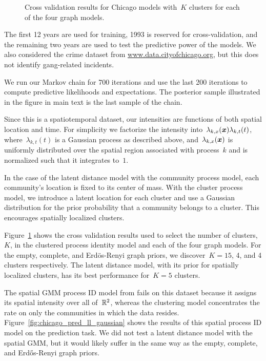 \begin{figure}[!t]
\begin{subfigure}[T]{.24\linewidth}
\begin{center}
\end{center}
\end{subfigure}
\caption{Cross validation results for Chicago models with~$K$ clusters for each of the four graph models.}
\label{fig:chicago_xv}
\end{figure}

The first 12 years are used for training, 1993 is reserved for cross-validation, and the remaining two years are used to test the predictive power of the models. We also considered the crime dataset from \url{www.data.cityofchicago.org}, but this does not identify gang-related incidents.

We run our Markov chain for 700 iterations and use the last 200 iterations to compute predictive likelihoods and expectations. The posterior sample illustrated in the figure in main text is the last sample of the chain.

Since this is a spatiotemporal dataset, our intensities are functions of both spatial location and time. For simplicity we factorize the intensity into~${\lambda_{k,x}(\boldsymbol{x})\lambda_{k,t}(t)}$, where~${\lambda_{k,t}(t)}$ is a Gaussian process as described above, and~${\lambda_{k,x}(\boldsymbol{x})}$ is uniformly distributed over the spatial region associated with process~$k$ and is normalized such that it integrates to~$1$. 

In the case of the latent distance model with the community process model, each community's location is fixed to its center of mass. With the cluster process model, we introduce a latent location for each cluster and use a Gaussian distribution for the prior probability that a community belongs to a cluster. This encourages spatially localized clusters.

Figure~\ref{fig:chicago_xv} shows the cross validation results used to select the number of clusters,~$K$, in the clustered process identity model and each of the four graph models. For the empty, complete, and Erd\"os-Renyi graph priors, we discover~${K=15}$, 4, and 4 clusters respectively. The latent distance model, with its prior for spatially localized clusters, has its best performance for~${K=5}$ clusters. 

The spatial GMM process ID model from \citet{Cho-2013} fails on this dataset because it assigns its spatial intensity over all of~$\mathbb{R}^2$, whereas the clustering model concentrates the rate on only the communities in which the data resides. Figure~\ref{fig:chicago_pred_ll_gaussian} shows the results of this spatial process ID model on the prediction task. We did not test a latent distance model with the spatial GMM, but it would likely suffer in the same way as the empty, complete, and Erd\H{o}s-Renyi graph priors.
 
